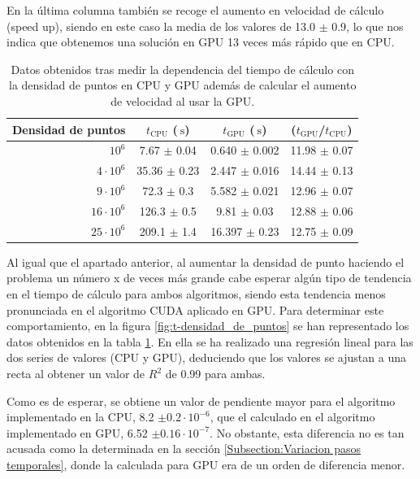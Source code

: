 \documentclass[11pt,a4paper,twoside,pdf]{article}
\numberwithin{equation}{section}
\begin{document}
En la última columna también se recoge el aumento en velocidad de cálculo (speed up), siendo en este caso la media de los valores de 13.0 $\pm$ 0.9, lo que nos indica que obtenemos una solución en GPU 13 veces más rápido que en CPU.

\begin{table}[h]
    \centering
    \begin{tabular}{|r|c|c|c|}
    \hline
    Densidad de puntos &  $t_\text{CPU}$ ($\SI{}{\second}$)  & $t_\text{GPU}$ ($\SI{}{\second}$) &  ($t_\text{GPU}$/$t_\text{CPU}$)  \\ \hline \hline
     $10^6$ & 7.67 $\pm$ 0.04         & 0.640 $\pm$ 0.002 & 11.98 $\pm$ 0.07\\ \hline
     $4\cdot 10^6$ & 35.36 $\pm$ 0.23 & 2.447 $\pm$ 0.016 & 14.44 $\pm$ 0.13\\ \hline
     $9\cdot 10^6$ & 72.3 $\pm$ 0.3   & 5.582 $\pm$ 0.021   & 12.96 $\pm$ 0.07\\ \hline
     $16\cdot 10^6$ & 126.3 $\pm$ 0.5 & 9.81 $\pm$ 0.03   & 12.88 $\pm$ 0.06\\ \hline
     $25\cdot 10^6$ & 209.1 $\pm$ 1.4 & 16.397 $\pm$ 0.23 & 12.75 $\pm$ 0.09\\ \hline
    \end{tabular}
    \caption{Datos obtenidos tras medir la dependencia del tiempo de cálculo con la densidad de puntos en CPU y GPU además de calcular el aumento de velocidad al usar la GPU.}
    \label{tab:t_densidad_de_punto}
\end{table}


Al igual que el apartado anterior, al aumentar la densidad de punto haciendo el problema un número x de veces más grande cabe esperar algún tipo de tendencia en el tiempo de cálculo para ambos algoritmos, siendo esta tendencia menos pronunciada en el algoritmo CUDA aplicado en GPU. Para determinar este comportamiento, en la figura \ref{fig:t-densidad_de_puntos} se han representado los datos obtenidos en la tabla \ref{tab:t_densidad_de_punto}. En ella se ha realizado una regresión lineal para las dos series de valores (CPU y GPU), deduciendo que los valores se ajustan a una recta al obtener un valor de $R^2$ de 0.99 para ambas. 

Como es de esperar, se obtiene un valor de pendiente mayor para el algoritmo implementado en la CPU, 8.2 $\pm 0.2 \cdot 10^{-6}$, que el calculado en el algoritmo implementado en GPU, 6.52 $\pm 0.16 \cdot 10^{-7}$. No obstante, esta diferencia no es tan acusada como la determinada en la sección \ref{Subsection:Variacion pasos temporales}, donde la calculada para GPU era de un orden de diferencia menor.
\end{document}
